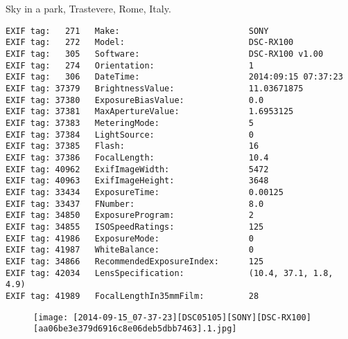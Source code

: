 \section{\protect{}}
\noindent Sky in a park, Trastevere, Rome, Italy.
\noindent
\begin{lstlisting}
EXIF tag:   271   Make:                          SONY
EXIF tag:   272   Model:                         DSC-RX100
EXIF tag:   305   Software:                      DSC-RX100 v1.00
EXIF tag:   274   Orientation:                   1
EXIF tag:   306   DateTime:                      2014:09:15 07:37:23
EXIF tag: 37379   BrightnessValue:               11.03671875
EXIF tag: 37380   ExposureBiasValue:             0.0
EXIF tag: 37381   MaxApertureValue:              1.6953125
EXIF tag: 37383   MeteringMode:                  5
EXIF tag: 37384   LightSource:                   0
EXIF tag: 37385   Flash:                         16
EXIF tag: 37386   FocalLength:                   10.4
EXIF tag: 40962   ExifImageWidth:                5472
EXIF tag: 40963   ExifImageHeight:               3648
EXIF tag: 33434   ExposureTime:                  0.00125
EXIF tag: 33437   FNumber:                       8.0
EXIF tag: 34850   ExposureProgram:               2
EXIF tag: 34855   ISOSpeedRatings:               125
EXIF tag: 41986   ExposureMode:                  0
EXIF tag: 41987   WhiteBalance:                  0
EXIF tag: 34866   RecommendedExposureIndex:      125
EXIF tag: 42034   LensSpecification:             (10.4, 37.1, 1.8, 4.9)
EXIF tag: 41989   FocalLengthIn35mmFilm:         28

\end{lstlisting}
\clearpage
\begin{figure}
\raggedleft
\texttt{[image: [2014-09-15\_07-37-23][DSC05105][SONY][DSC-RX100][aa06be3e379d6916c8e06deb5dbb7463].1.jpg]}
\end{figure}


\clearpage
